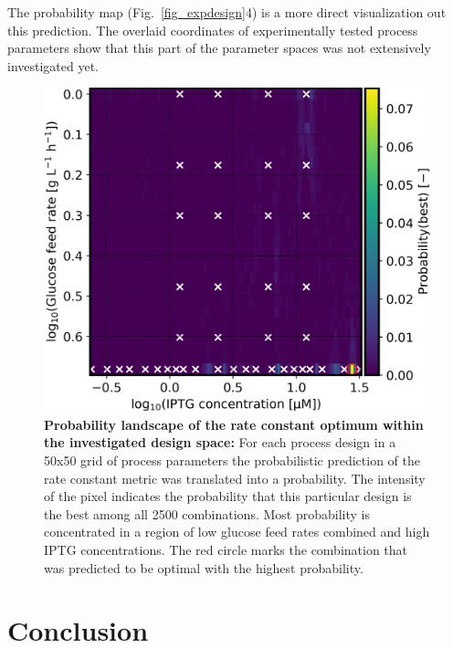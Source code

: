 \documentclass[sn-standardnature]{sn-jnl}%
\theoremstyle{thmstyleone}%
\theoremstyle{thmstyletwo}%
\theoremstyle{thmstylethree}%
\begin{document}
The probability map (Fig.~\ref{fig_expdesign}4) is a more direct visualization out this prediction.
The overlaid coordinates of experimentally tested process parameters show that this part of the parameter spaces was not extensively investigated yet.

\begin{figure}[h]
    \centering
    \includegraphics[width=1.0\textwidth]{figures/p_best_k_design.png}
    \caption{
        \textbf{Probability landscape of the rate constant optimum within the investigated design space:}
        For each process design in a 50x50 grid of process parameters the probabilistic prediction of the rate constant metric was translated into a probability.
        The intensity of the pixel indicates the probability that this particular design is the best among all 2500 combinations.
        Most probability is concentrated in a region of low glucose feed rates combined and high IPTG concentrations.
        The red circle marks the combination that was predicted to be optimal with the highest probability.
    }
    \label{fig_kdesign_probs}
\end{figure}


\section{Conclusion}
\end{document}
